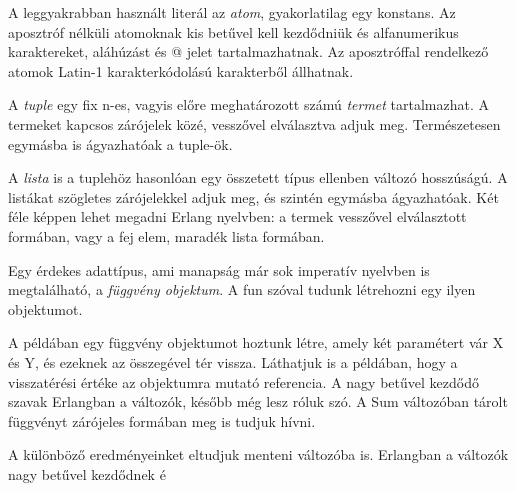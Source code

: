 \documentclass[twoside, a4paper, 12pt]{article}
\begin{document}


A leggyakrabban használt literál az \textit{atom}, gyakorlatilag egy konstans. Az aposztróf nélküli atomoknak kis betűvel kell kezdődniük és alfanumerikus karaktereket, aláhúzást és @ jelet tartalmazhatnak. Az aposztróffal rendelkező atomok Latin-1 karakterkódolású karakterből állhatnak.



A \textit{tuple} egy fix n-es, vagyis előre meghatározott számú \textit{termet} tartalmazhat. A termeket kapcsos zárójelek közé, vesszővel elválasztva adjuk meg. Természetesen egymásba is ágyazhatóak a tuple-ök.



A \textit{lista} is a tuplehöz hasonlóan egy összetett típus ellenben változó hosszúságú. A listákat szögletes zárójelekkel adjuk meg, és szintén egymásba ágyazhatóak. Két féle képpen lehet megadni Erlang nyelvben: a termek vesszővel elválasztott formában, vagy a fej elem, maradék lista formában.



Egy érdekes adattípus, ami manapság már sok imperatív nyelvben is megtalálható, a \textit{függvény objektum}. A fun szóval tudunk létrehozni egy ilyen objektumot.



A példában egy függvény objektumot hoztunk létre, amely két paramétert vár X és Y, és ezeknek az összegével tér vissza. Láthatjuk is a példában, hogy a visszatérési értéke az objektumra mutató referencia. A nagy betűvel kezdődő szavak Erlangban a változók, később még lesz róluk szó. A Sum változóban tárolt függvényt zárójeles formában meg is tudjuk hívni.


A különböző eredményeinket eltudjuk menteni változóba is. Erlangban a változók nagy betűvel kezdődnek é
\end{document}
